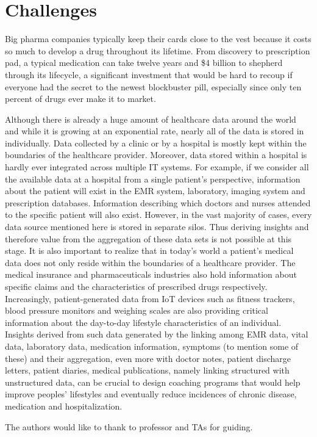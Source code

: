 \documentclass[sigconf]{acmart}
\begin{document}
\section{Challenges}
Big pharma companies typically keep their cards close to the vest because it costs so much to develop a drug throughout its lifetime.  From discovery to prescription pad, a typical medication can take twelve years and \$4 billion to shepherd through its lifecycle, a significant investment that would be hard to recoup if everyone had the secret to the newest blockbuster pill, especially since only ten percent of drugs ever make it to market.

Although there is already a huge amount of healthcare data around the world and while it is growing
at an exponential rate, nearly all of the data is stored in individually. Data collected by a  clinic
or by a hospital is mostly kept within the boundaries of the healthcare provider. Moreover, data stored
within a hospital is hardly ever integrated across multiple IT systems. For example, if we consider all
the available data at a hospital from a single patient’s perspective, information about the patient will
exist in the EMR system, laboratory, imaging system and prescription databases. Information
describing which doctors and nurses attended to the specific patient will also exist. However, in the
vast majority of cases, every data source mentioned here is stored in separate silos. Thus deriving
insights and therefore value from the aggregation of these data sets is not possible at this stage. It is
also important to realize that in today’s world a patient’s medical data does not only reside within the
boundaries of a healthcare provider. The medical insurance and pharmaceuticals industries also hold
information about specific claims and the characteristics of prescribed drugs respectively. Increasingly,
patient-generated data from IoT devices such as fitness trackers, blood pressure monitors and
weighing scales are also providing critical information about the day-to-day lifestyle characteristics of
an individual. Insights derived from such data generated by the linking among EMR data, vital data,
laboratory data, medication information, symptoms (to mention some of these) and their aggregation,
even more with doctor notes, patient discharge letters, patient diaries, medical publications, namely
linking structured with unstructured data, can be crucial to design coaching programs that would
help improve peoples’ lifestyles and eventually reduce incidences of chronic disease, medication and
hospitalization. 

\begin{acks}

  The authors would like to thank to professor and TAs for guiding.

\end{acks}


 
\end{document}
